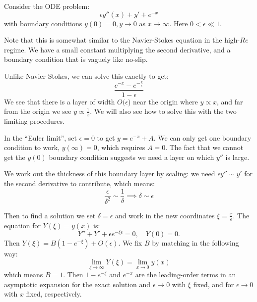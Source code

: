 \documentclass[../Main.tex]{subfiles}
\begin{document}
\begin{example}
    Consider the ODE problem:
    \begin{equation*}
        \epsilon y''(x) + y' + e^{-x}
    \end{equation*}
    with boundary conditions $y(0) = 0, y \to 0$ as $x \to \infty$. Here $0 < \epsilon \ll 1$.

    Note that this is somewhat similar to the Navier-Stokes equation in the high-$Re$ regime. We have a small constant multiplying the second derivative, and a boundary condition that is vaguely like no-slip.

    Unlike Navier-Stokes, we can solve this exactly to get:
    \begin{equation*}
        \frac{e^{-x} - e^{-\frac x \epsilon}}{1-\epsilon}
    \end{equation*}
    We see that there is a layer of width $O(\epsilon$) near the origin where $y \propto x$, and far from the origin we see $y \propto \frac1x$. We will also see how to solve this with the two limiting procedures.

    In the ``Euler limit'', set $\epsilon = 0$ to get $y = e^{-x} + A$. We can only get one boundary condition to work, $y(\infty) = 0$, which requires $A = 0$. The fact that we cannot get the $y(0)$ boundary condition suggests we need a layer on which $y''$ is large.

    We work out the thickness of this boundary layer by scaling: we need $\epsilon y'' \sim y'$ for the second derivative to contribute, which means:
    \begin{equation*}
        \frac{\epsilon}{\delta^2} \sim \frac1\delta \implies \delta \sim \epsilon
    \end{equation*}

    Then to find a solution we set $\delta = \epsilon$ and work in the new coordinates $\xi = \frac x \epsilon$. The equation for $Y(\xi) = y(x)$ is:
    \begin{equation*}
        Y'' + Y' + \epsilon e^{-\xi\epsilon} = 0,\quad Y(0) = 0.
    \end{equation*}
    Then $Y(\xi) = B(1 - e^{-\xi}) + O(\epsilon)$. We fix $B$ by matching in the following way:
    \begin{equation*}
        \lim_{\xi \to \infty} Y(\xi) = \lim_{x \to 0} y(x)
    \end{equation*}
    which means $B = 1$. Then $1 - e^{-\xi}$ and $e^{-x}$ are the leading-order terms in an asymptotic expansion for the exact solution and $\epsilon \to 0$ with $\xi$ fixed, and for $\epsilon \to 0$ with $x$ fixed, respectively.
\end{example}
\end{document}
